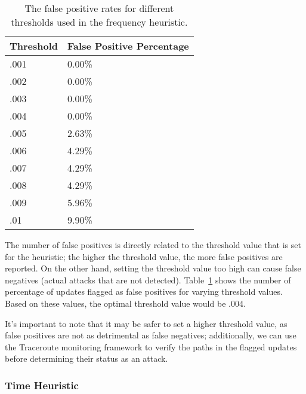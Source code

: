 \begin{table}[h]
\begin{center}
    \begin{tabular}{| l | l |}
    \hline
    Threshold & False Positive Percentage \\ \hline \hline
    .001 & 0.00\% \\ \hline
    .002 & 0.00\% \\ \hline
    .003 & 0.00\% \\ \hline
    .004 & 0.00\% \\ \hline
    .005 & 2.63\% \\ \hline
    .006 & 4.29\% \\ \hline
    .007 & 4.29\% \\ \hline
    .008 & 4.29\% \\ \hline
    .009 & 5.96\% \\ \hline
    .01 & 9.90\% \\
    \hline
    \end{tabular}
\end{center}
\caption{The false positive rates for different thresholds used in the frequency heuristic.}
\label{tab:frequency}
\end{table}

The number of false positives is directly related to the threshold value that is set for the heuristic; the higher the threshold value, the more false positives are reported.  On the other hand, setting the threshold value too high can cause false negatives (actual attacks that are not detected).  Table~\ref{tab:frequency} shows the number of percentage of updates flagged as false positives for varying threshold values.  Based on these values, the optimal threshold value would be .004.  

It's important to note that it may be safer to set a higher threshold value, as false positives are not as detrimental as false negatives; additionally, we can use the Traceroute monitoring framework to verify the paths in the flagged updates before determining their status as an attack.  

\subsubsection{Time Heuristic}

